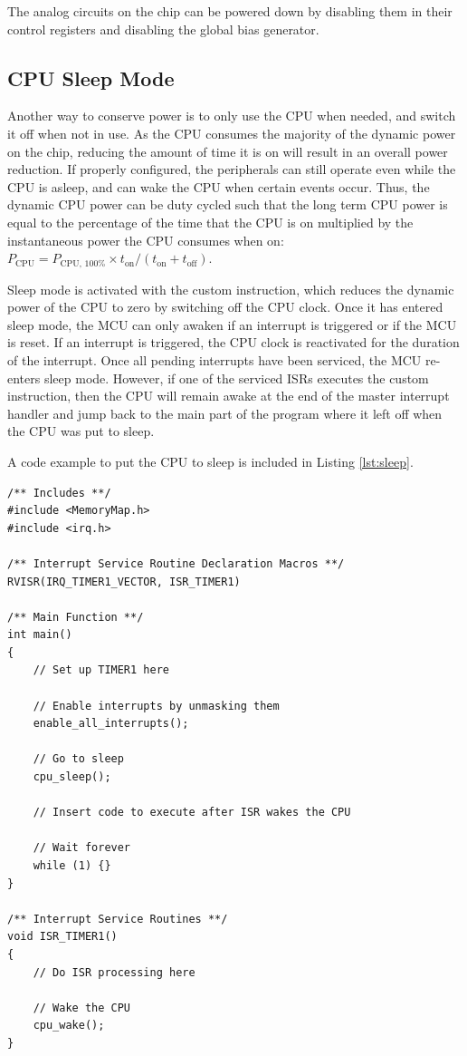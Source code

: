 The analog circuits on the chip can be powered down by disabling them in their control registers and disabling the global bias generator.



\subsection{CPU Sleep Mode} \label{ss:sleep}

Another way to conserve power is to only use the CPU when needed, and switch it off when not in use. As the CPU consumes the majority of the dynamic power on the chip, reducing the amount of time it is on will result in an overall power reduction. If properly configured, the peripherals can still operate even while the CPU is asleep, and can wake the CPU when certain events occur. Thus, the dynamic CPU power can be duty cycled such that the long term CPU power is equal to the percentage of the time that the CPU is on multiplied by the instantaneous power the CPU consumes when on: $P_\textrm{CPU} = P_\textrm{CPU, 100\%} \times t_\textrm{on}/(t_\textrm{on} + t_\textrm{off})$.

Sleep mode is activated with the custom  instruction, which reduces the dynamic power of the CPU to zero by switching off the CPU clock. Once it has entered sleep mode, the MCU can only awaken if an interrupt is triggered or if the MCU is reset. If an interrupt is triggered, the CPU clock is reactivated for the duration of the interrupt. Once all pending interrupts have been serviced, the MCU re-enters sleep mode. However, if one of the serviced ISRs executes the custom  instruction, then the CPU will remain awake at the end of the master interrupt handler and jump back to the main part of the program where it left off when the CPU was put to sleep.

A code example to put the CPU to sleep is included in Listing \ref{lst:sleep}.

\begin{lstlisting}[style=customC, label=lst:sleep, caption={Example program to use CPU sleep mode}]
/** Includes **/
#include <MemoryMap.h>
#include <irq.h>

/** Interrupt Service Routine Declaration Macros **/
RVISR(IRQ_TIMER1_VECTOR, ISR_TIMER1)

/** Main Function **/
int main()
{
	// Set up TIMER1 here

	// Enable interrupts by unmasking them
	enable_all_interrupts();

	// Go to sleep
	cpu_sleep();

	// Insert code to execute after ISR wakes the CPU

	// Wait forever
	while (1) {}
}

/** Interrupt Service Routines **/
void ISR_TIMER1()
{
	// Do ISR processing here

	// Wake the CPU
	cpu_wake();
}
\end{lstlisting}



